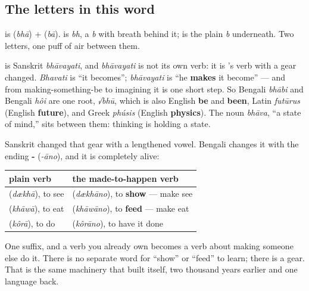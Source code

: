 \subsection*{The letters in this word}
\textbf{} is \textbf{} (\emph{bhā}) +  (\emph{bā}). \textbf{} is \emph{bh}, a \emph{b} with breath behind it; \textbf{} is the plain \emph{b} underneath. Two letters, one puff of air between them.

\begin{cousinweb}
\textbf{} is Sanskrit \emph{bhāvayati}, and \emph{bhāvayati} is not its own verb: it is \textbf{}'s verb with a gear changed. \emph{Bhavati} is \textquotedblleft{}it becomes\textquotedblright{}; \emph{bhāvayati} is \textquotedblleft{}he \textbf{makes} it become\textquotedblright{} — and from making-something-be to imagining it is one short step. So Bengali \emph{bhābi} and Bengali \emph{hôi} are one root, \emph{√bhū}, which is also English \textbf{be} and \textbf{been}, Latin \emph{futūrus} (English \textbf{future}), and Greek \emph{phúsis} (English \textbf{physics}). The noun \emph{bhāva}, \textquotedblleft{}a state of mind,\textquotedblright{} sits between them: thinking is holding a state.
\end{cousinweb}

\begin{grammarlens}[title={Grammar Lens: the gear that makes someone else do it}]
Sanskrit changed that gear with a lengthened vowel. Bengali changes it with the ending \textbf{-} (\emph{-āno}), and it is completely alive:

\noindent
\begin{tabularx}{\linewidth}{@{}>{\raggedright\arraybackslash}X>{\raggedright\arraybackslash}X@{}}
\toprule
\textbf{plain verb} & \textbf{the made-to-happen verb} \\
\midrule
\bn{দেখা} (\emph{dækhā}), to see & \bn{দেখানো} (\emph{dækhāno}), to \textbf{show} — make see \\
\bn{খাওয়া} (\emph{khāwā}), to eat & \bn{খাওয়ানো} (\emph{khāwāno}), to \textbf{feed} — make eat \\
\bn{করা} (\emph{kôrā}), to do & \bn{করানো} (\emph{kôrāno}), to have it done \\
\bottomrule
\end{tabularx}

One suffix, and a verb you already own becomes a verb about making someone else do it. There is no separate word for \textquotedblleft{}show\textquotedblright{} or \textquotedblleft{}feed\textquotedblright{} to learn; there is a gear. That is the same machinery that built  itself, two thousand years earlier and one language back.
\end{grammarlens}

